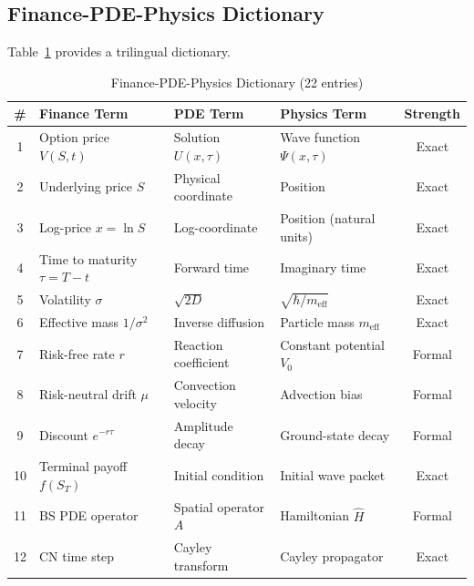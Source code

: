 \subsection{Finance-PDE-Physics Dictionary}

Table~\ref{tab:dictionary} provides a trilingual dictionary.

\begin{table}[!t]
\centering
\caption{Finance-PDE-Physics Dictionary (22 entries)}
\label{tab:dictionary}
\begin{tabular}{clllc}
\toprule
\textbf{\#} & \textbf{Finance Term} & \textbf{PDE Term} & \textbf{Physics Term} & \textbf{Strength} \\
\midrule
1  & Option price $V(S,t)$          & Solution $U(x,\tau)$       & Wave function $\Psi(x,\tau)$             & Exact \\
2  & Underlying price $S$           & Physical coordinate        & Position                                 & Exact \\
3  & Log-price $x = \ln S$          & Log-coordinate             & Position (natural units)                  & Exact \\
4  & Time to maturity $\tau=T{-}t$  & Forward time               & Imaginary time                            & Exact \\
5  & Volatility $\sigma$            & $\sqrt{2D}$                & $\sqrt{\hbar/m_{\text{eff}}}$             & Exact \\
6  & Effective mass $1/\sigma^2$    & Inverse diffusion          & Particle mass $m_{\text{eff}}$            & Exact \\
7  & Risk-free rate $r$             & Reaction coefficient       & Constant potential $V_0$                  & Formal \\
8  & Risk-neutral drift $\mu$       & Convection velocity        & Advection bias                            & Formal \\
9  & Discount $e^{-r\tau}$          & Amplitude decay            & Ground-state decay                        & Formal \\
10 & Terminal payoff $f(S_T)$       & Initial condition          & Initial wave packet                       & Exact \\
11 & BS PDE operator                & Spatial operator $A$       & Hamiltonian $\hat{H}$                     & Formal \\
12 & CN time step                   & Cayley transform           & Cayley propagator                         & Exact \\

\end{tabular}
\end{table}
